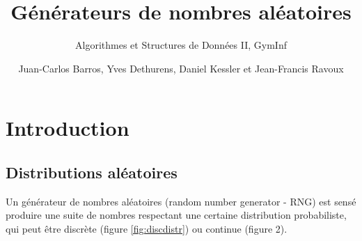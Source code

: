 \documentclass{scrartcl}
\title{Générateurs de nombres aléatoires}
\subtitle{Algorithmes et Structures de Données II, GymInf}
\author{Juan-Carlos Barros, Yves Dethurens, Daniel Kessler et Jean-Francis Ravoux}
\begin{document}
\maketitle

\tableofcontents

\section{Introduction}\label{s:intro}

\subsection{Distributions aléatoires}
Un générateur de nombres aléatoires (random number generator - RNG) est sensé
produire une suite de nombres respectant une certaine distribution probabiliste,
qui peut être discrète (figure \ref{fig:discdistr}) ou continue (figure 2).
\end{document}
